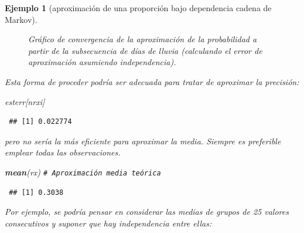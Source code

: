 \documentclass[
  spanish,
  10pt,
]{book}
\newenvironment{Shaded}{\begin{snugshade}}{\end{snugshade}}
\newcommand{\CommentTok}[1]{\textcolor[rgb]{0.56,0.35,0.01}{\textit{#1}}}
\newcommand{\FunctionTok}[1]{\textcolor[rgb]{0.13,0.29,0.53}{\textbf{#1}}}
\newcommand{\NormalTok}[1]{#1}
\theoremstyle{break}
\newtheorem{example}{Ejemplo}[chapter]
\theoremstyle{nonumberplain}
\renewcommand{\CommentTok}[1]{\textcolor[rgb]{0.41,0.41,0.41}{\texttt{#1}}}
\begin{document}
\begin{example}[aproximación de una proporción bajo dependencia cadena de Markov]
\begin{figure}[!htbp]
{}

\caption{Gráfico de convergencia de la aproximación de la probabilidad a partir de la subsecuencia de días de lluvia (calculando el error de aproximación asumiendo independencia).}\label{fig:conv-dep2}
\end{figure}

Esta forma de proceder podría ser adecuada para tratar de aproximar la precisión:

\begin{Shaded}
\begin{Highlighting}[]
\NormalTok{esterr[nrxi]}
\end{Highlighting}
\end{Shaded}

\begin{verbatim}
 ## [1] 0.022774
\end{verbatim}

pero no sería la más eficiente para aproximar la media. Siempre es preferible emplear todas las observaciones.

\begin{Shaded}
\begin{Highlighting}[]
\FunctionTok{mean}\NormalTok{(rx) }\CommentTok{\# Aproximación media teórica}
\end{Highlighting}
\end{Shaded}

\begin{verbatim}
 ## [1] 0.3038
\end{verbatim}

Por ejemplo, se podría pensar en considerar las medias de grupos de 25 valores consecutivos y suponer que hay independencia entre ellas:


\end{example}
\end{document}
